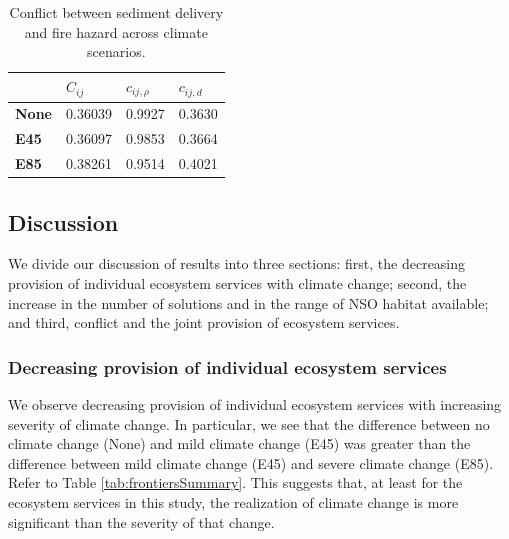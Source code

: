 \begin{table}[]
\centering
\caption[Sediment delivery-fire hazard conflict across climate scenarios]{Conflict between sediment delivery and fire hazard across climate scenarios.}
\label{tab:pairConflict-SedFire}
\begin{tabular}{l|l|ll}
\textbf{}     & \textbf{$C_{ij}$} & \textbf{$c_{ij,\rho}$} & \textbf{$c_{ij,d}$} \\ \hline
\textbf{None} & 0.36039           & 0.9927                 & 0.3630              \\
\textbf{E45}  & 0.36097           & 0.9853                 & 0.3664              \\
\textbf{E85}  & 0.38261           & 0.9514                 & 0.4021
\end{tabular}
\end{table}

\subsection{Discussion}
We divide our discussion of results into three sections: first, the decreasing provision of individual ecosystem services with climate change; second, the increase in the number of solutions and in the range of NSO habitat available; and third, conflict and the joint provision of ecosystem services.

\subsubsection{Decreasing provision of individual ecosystem services}
We observe decreasing provision of individual ecosystem services with increasing severity of climate change. In particular, we see that the difference between no climate change (None) and mild climate change (E45) was greater than the difference between mild climate change (E45) and severe climate change (E85). Refer to Table \ref{tab:frontiersSummary}. This suggests that, at least for the ecosystem services in this study, the realization of climate change is more significant than the severity of that change.

